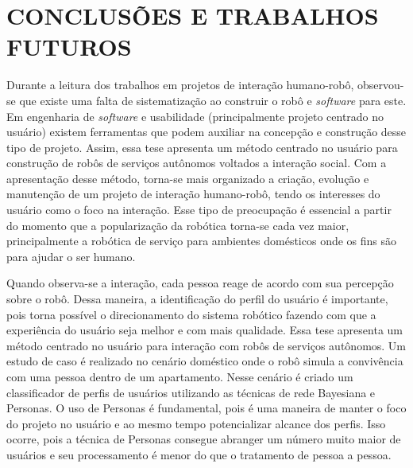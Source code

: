 \chapter{CONCLUSÕES E TRABALHOS FUTUROS}
\label{cap:conclusoes}
Durante a leitura dos trabalhos em projetos de interação humano-robô, observou-se que existe uma falta de sistematização ao construir o robô e \textit{software} para este. Em engenharia de \textit{software} e usabilidade (principalmente projeto centrado no usuário) existem ferramentas que podem auxiliar na concepção e construção desse tipo de projeto. Assim, essa tese apresenta um método centrado no usuário para construção de robôs de serviços autônomos voltados a interação social. Com a apresentação desse método, torna-se mais organizado a criação, evolução e manutenção de um projeto de interação humano-robô, tendo os interesses do usuário como o foco na interação. Esse tipo de preocupação é essencial a partir do momento que a popularização da robótica torna-se cada vez maior, principalmente a robótica de serviço para ambientes domésticos onde os fins são para ajudar o ser humano.

Quando observa-se a interação, cada pessoa reage de acordo com sua percepção sobre o robô. Dessa maneira, a identificação do perfil do usuário é importante, pois torna possível o direcionamento do sistema robótico fazendo com que a experiência do usuário seja melhor e com mais qualidade. Essa tese apresenta um método centrado no usuário para interação com robôs de serviços autônomos. Um estudo de caso é realizado no cenário doméstico onde o robô simula a convivência com uma pessoa dentro de um apartamento. Nesse cenário é criado um classificador de perfis de usuários utilizando as técnicas de rede Bayesiana e Personas. O uso de Personas é fundamental, pois é uma maneira de manter o foco do projeto no usuário e ao mesmo tempo potencializar alcance dos perfis. Isso ocorre, pois a técnica de Personas consegue abranger um número muito maior de usuários e seu processamento é menor do que o tratamento de pessoa a pessoa. 

